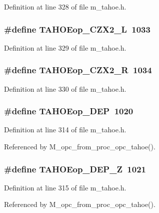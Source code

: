 Definition at line 328 of file m\_\-tahoe.h.
\subsubsection{\setlength{\rightskip}{0pt plus 5cm}\#define TAHOEop\_\-CZX2\_\-L~1033}\label{m__tahoe_8h_7d7ead8de08f678353613386f7ba8b20}




Definition at line 329 of file m\_\-tahoe.h.
\subsubsection{\setlength{\rightskip}{0pt plus 5cm}\#define TAHOEop\_\-CZX2\_\-R~1034}\label{m__tahoe_8h_63011c994c01812575e0c37b4e1d32ee}




Definition at line 330 of file m\_\-tahoe.h.
\subsubsection{\setlength{\rightskip}{0pt plus 5cm}\#define TAHOEop\_\-DEP~1020}\label{m__tahoe_8h_64a45ef06fbd9169ddc957c917fe7be0}




Definition at line 314 of file m\_\-tahoe.h.

Referenced by M\_\-opc\_\-from\_\-proc\_\-opc\_\-tahoe().
\subsubsection{\setlength{\rightskip}{0pt plus 5cm}\#define TAHOEop\_\-DEP\_\-Z~1021}\label{m__tahoe_8h_a67bba3841e5f2eb2035b139f26981b9}




Definition at line 315 of file m\_\-tahoe.h.

Referenced by M\_\-opc\_\-from\_\-proc\_\-opc\_\-tahoe().
